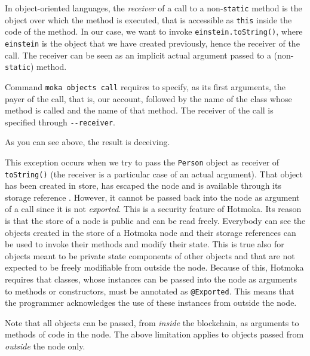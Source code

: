 \begin{commentbox}
In object-oriented languages, the \emph{receiver} of a call to a non-\texttt{static}
method is the object over which the method is executed, that is accessible
as \texttt{this} inside the code of the method. In our case, we want to invoke
\texttt{einstein.toString()}, where \texttt{einstein} is the object that we have created
previously, hence the receiver of the call.
The receiver can be seen as an implicit actual argument passed to a (non-\texttt{static}) method.
\end{commentbox}
%
%
Command \texttt{moka objects call} requires to specify, as its first arguments,
the payer of the call, that is, our account, followed by the name of the class whose
method is called and the name of that method. The receiver of the call is specified through
\texttt{-{}-receiver}.

As you can see above, the result is deceiving.

This exception occurs when we try to pass the \texttt{Person} object
as receiver of \texttt{toString()} (the receiver is a particular case of an actual
argument). That object has been created in store, has escaped the node
and is available through its storage reference \texttt{\personObjectTwoShort}.
However, it cannot be passed back
into the node as argument of a call since it is not \emph{exported}. This is a security feature of
Hotmoka. Its reason is that the store of a node is public and can be read freely.
Everybody can see the objects created in the store of a Hotmoka node
and their storage references can be used to invoke their methods and modify their state.
This is true also for objects meant to be private state components of other objects and that
are not expected to be freely modifiable from outside the node. Because of this,
Hotmoka requires that classes, whose instances can be passed into the node as
arguments to methods or constructors,
must be annotated as \texttt{@Exported}.
This means that the programmer acknowledges the
use of these instances from outside the node.
%
\begin{commentbox}
Note that all objects can be passed, from \emph{inside} the blockchain, as arguments to methods
of code in the node. The above limitation applies to objects passed from \emph{outside}
the node only.
\end{commentbox}

